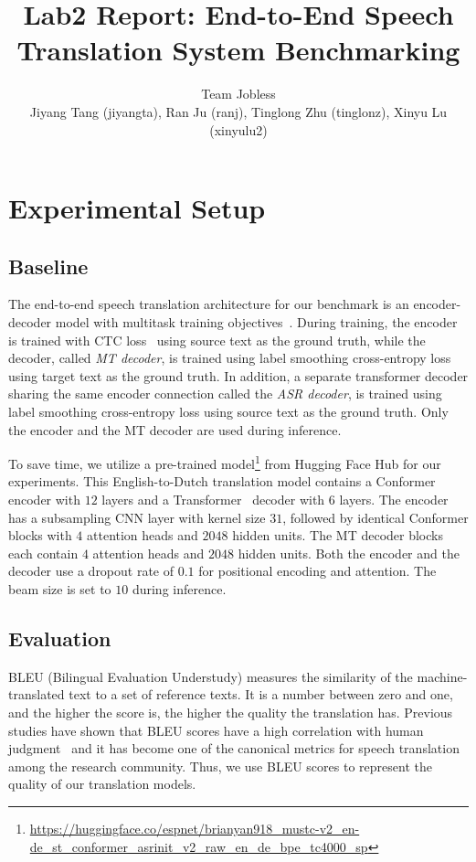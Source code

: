 \documentclass[11pt]{article}
\title{Lab2 Report: End-to-End Speech Translation System Benchmarking}
\author{
  Team Jobless\\
  Jiyang Tang (jiyangta), Ran Ju (ranj), Tinglong Zhu (tinglonz), Xinyu Lu (xinyulu2)\\
}
\begin{document}
\maketitle


\section{Experimental Setup}

\subsection{Baseline}

The end-to-end speech translation architecture for our benchmark is an encoder-decoder model with multitask training objectives~\cite{inaguma2020espnet}.
During training, the encoder is trained with CTC loss~\cite{CTC} using source text as the ground truth, while the decoder, called \textit{MT decoder}, is trained using label smoothing cross-entropy loss using target text as the ground truth.
In addition, a separate transformer decoder sharing the same encoder connection called the \textit{ASR decoder}, is trained using label smoothing cross-entropy loss using source text as the ground truth.
Only the encoder and the MT decoder are used during inference.

To save time, we utilize a pre-trained model\footnote{\url{https://huggingface.co/espnet/brianyan918_mustc-v2_en-de_st_conformer_asrinit_v2_raw_en_de_bpe_tc4000_sp}} from Hugging Face Hub for our experiments.
This English-to-Dutch translation model contains a Conformer~\cite{conformer} encoder with $12$ layers and a Transformer~\cite{transformer} decoder with $6$ layers.
The encoder has a subsampling CNN layer with kernel size $31$, followed by identical Conformer blocks with $4$ attention heads and $2048$ hidden units.
The MT decoder blocks each contain $4$ attention heads and $2048$ hidden units.
Both the encoder and the decoder use a dropout rate of $0.1$ for positional encoding and attention.
The beam size is set to $10$ during inference.

\subsection{Evaluation}

BLEU (Bilingual Evaluation Understudy) measures the similarity of the machine-translated text to a set of reference texts.
It is a number between zero and one, and the higher the score is, the higher the quality the translation has.
Previous studies have shown that BLEU scores have a high correlation with human judgment~\cite{bleu} and it has become one of the canonical metrics for speech translation among the research community.
Thus, we use BLEU scores to represent the quality of our translation models.
\end{document}
